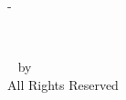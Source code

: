 \begin{titlingpage}
\begin{SingleSpace}
\begin{adjustwidth*}{\unitlength}{-\unitlength}
\begin{center}
{\large{\DTMenglishmonthname{\utsmonth}~\utsyear}}
\end{center}
\end{adjustwidth*}

\clearpage

\pagestyle{empty}
\null\vfill
\begin{center}
  {\textcopyright}~{\utsyear} by \href{utsurl}{\utsname}
  \\All Rights Reserved
\end{center}
\end{SingleSpace}
\end{titlingpage}